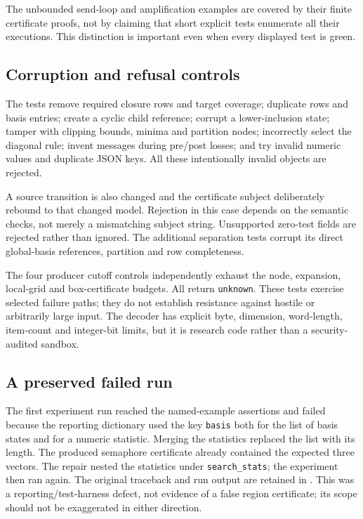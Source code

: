 \documentclass[11pt,a4paper]{article}
\theoremstyle{definition}
\newcommand{\code}[1]{\texttt{#1}}
\begin{document}
The unbounded send-loop and amplification examples are covered by their
finite certificate proofs, not by claiming that short explicit tests enumerate
all their executions. This distinction is important even when every displayed
test is green.

\subsection{Corruption and refusal controls}
The tests remove required closure rows and target coverage; duplicate rows
and basis entries; create a cyclic child reference; corrupt a lower-inclusion
state; tamper with clipping bounds, minima and partition nodes; incorrectly
select the diagonal rule; invent messages during pre/post losses; and try
invalid numeric values and duplicate JSON keys. All these intentionally
invalid objects are rejected.

A source transition is also changed and the certificate subject deliberately
rebound to that changed model. Rejection in this case depends on the semantic
checks, not merely a mismatching subject string. Unsupported zero-test fields
are rejected rather than ignored. The additional separation tests corrupt
its direct global-basis references, partition and row completeness.

The four producer cutoff controls independently exhaust the node, expansion,
local-grid and box-certificate budgets. All return \code{unknown}. These tests
exercise selected failure paths; they do not establish resistance against
hostile or arbitrarily large input. The decoder has explicit byte, dimension,
word-length, item-count and integer-bit limits, but it is research code rather
than a security-audited sandbox.

\subsection{A preserved failed run}
The first experiment run reached the named-example assertions and failed
because the reporting dictionary used the key \code{basis} both for the
list of basis states and for a numeric statistic. Merging the statistics
replaced the list with its length. The produced semaphore certificate already
contained the expected three vectors. The repair nested the statistics under
\code{search\_stats}; the experiment then ran again. The original traceback
and run output are retained in . This was a
reporting/test-harness defect, not evidence of a false region certificate;
its scope should not be exaggerated in either direction.
\end{document}
